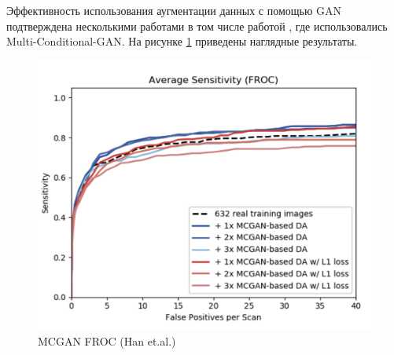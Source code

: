 Эффективность использования аугментации данных с помощью GAN подтверждена несколькими работами в том числе работой \cite{han}, где использовались Multi-Conditional-GAN. На рисунке \ref{mcgan} приведены наглядные результаты.

\begin{figure}[!h]
\includegraphics[width=\linewidth]{mcgan-results.png}
\caption{MCGAN FROC (Han et.al.)}\label{mcgan}
\centering
\end{figure}

